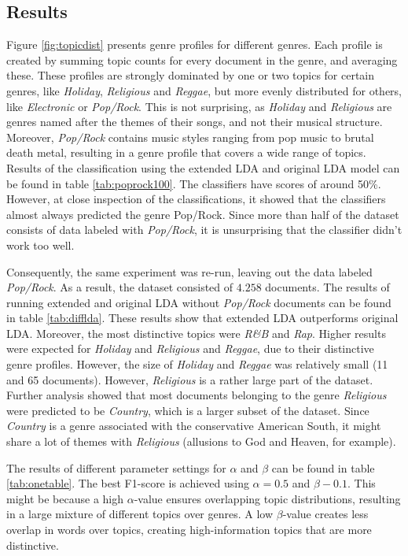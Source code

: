 \subsection{Results}
Figure \ref{fig:topicdist} presents genre profiles for different genres. Each profile is created by summing topic counts for every document in the genre, and averaging these. These profiles are strongly dominated by one or two topics for certain genres, like \textit{Holiday}, \textit{Religious} and \textit{Reggae}, but more evenly distributed for others, like \textit{Electronic} or \textit{Pop/Rock}. This is not surprising, as \textit{Holiday} and \textit{Religious} are genres named after the themes of their songs, and not their musical structure. Moreover, \textit{Pop/Rock} contains music styles ranging from pop music to brutal death metal, resulting in a genre profile that covers a wide range of topics. Results of the classification using the extended LDA and original LDA model can be found in table \ref{tab:poprock100}. The classifiers have scores of around 50\%. However, at close inspection of the classifications, it showed that the classifiers almost always predicted the genre Pop/Rock. Since more than half of the dataset consists of data labeled with \textit{Pop/Rock}, it is unsurprising that the classifier didn't work too well. 



Consequently, the same experiment was re-run, leaving out the data labeled \textit{Pop/Rock}. As a result, the dataset consisted of $4.258$ documents. The results of running extended and original LDA without \textit{Pop/Rock} documents can be found in table \ref{tab:difflda}. These results show that extended LDA outperforms original LDA. Moreover, the most distinctive topics were \textit{R\&B} and \textit{Rap}. Higher results were expected for \textit{Holiday} and \textit{Religious} and \textit{Reggae}, due to their distinctive genre profiles. However, the size of \textit{Holiday} and \textit{Reggae} was relatively small (11 and 65 documents). However, \textit{Religious} is a rather large part of the dataset. Further analysis showed that most documents belonging to the genre \textit{Religious} were predicted to be \textit{Country}, which is a larger subset of the dataset. Since \textit{Country} is a genre associated with the conservative American South, it might share a lot of themes with \textit{Religious} (allusions to God and Heaven, for example). 

The results of different parameter settings for $\alpha$ and $\beta$ can be found in table \ref{tab:onetable}. The best F1-score is achieved using $\alpha=0.5$ and $\beta-0.1$. This might be because a high $\alpha$-value ensures overlapping topic distributions, resulting in a large mixture of different topics over genres. A low $\beta$-value creates less overlap in words over topics, creating high-information topics that are more distinctive.

\label{tab:onetable}



